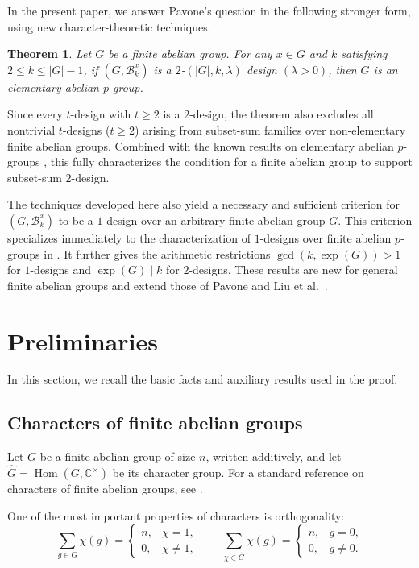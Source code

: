 \documentclass[11pt]{article}
\newtheorem{theorem}{Theorem}[section]
\theoremstyle{definition}
\newcommand{\cB}{\mathcal B}
\begin{document}
 
In the present paper, we answer Pavone's question \cite{Pavone2023} in the following stronger form, using new character-theoretic techniques.
\begin{theorem}\label{thm:main}
	Let \(G\) be a finite abelian group. For any \(x\in G\) and \(k\) satisfying $2\le k\le |G|-1$, if \((G,\cB_k^x)\) is a \(2\)-\((|G|,k,\lambda)\) design $(\lambda>0)$, then $G$ is an elementary abelian \(p\)-group.
\end{theorem}

Since every \(t\)-design with \(t\ge2\) is a \(2\)-design, the theorem also excludes all nontrivial \(t\)-designs ($t\ge2$) arising from subset-sum families over non-elementary finite abelian groups. Combined with the known results on elementary abelian \(p\)-groups \cite{FalconePavone2021,Pavone2023}, this fully characterizes the condition for a finite abelian group to support subset-sum $2$-design.

The techniques developed here also yield a necessary and sufficient criterion for $(G,\cB_k^x)$ to be a $1$-design over an arbitrary finite abelian group $G$. This criterion specializes immediately to the characterization of $1$-designs over finite abelian $p$-groups in \cite[Theorem~3.3]{LiuTangFanLuo2025}. It further gives the arithmetic restrictions $\gcd(k,\exp(G))>1$ for $1$-designs and $\exp(G)\mid k$ for $2$-designs. These results are new for general finite abelian groups and extend those of Pavone \cite{Pavone2023} and Liu et al.~\cite{LiuTangFanLuo2025}.



\section{Preliminaries}\label{sec:preliminaries}
In this section, we recall the basic facts and auxiliary results used in the proof.

\subsection{Characters of finite abelian groups}
Let \(G\) be a finite abelian group of size $n$, written additively, and let \(\widehat G=\operatorname{Hom}(G,\mathbb C^\times)\) be its character group. For a standard reference on characters of finite abelian groups, see \cite{Serre1973}.

One of the most important properties of characters is orthogonality:
\begin{equation}\label{eq:character-orthogonality}
	\sum_{g\in G}\chi(g)=
	\begin{cases}
		n,&\chi=1,\\
		0,&\chi\ne 1,
	\end{cases}
	\qquad
	\sum_{\chi\in\widehat G}\chi(g)=
	\begin{cases}
		n,&g=0,\\
		0,&g\ne 0.
	\end{cases}
\end{equation}
\end{document}
